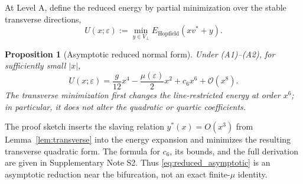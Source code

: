 \documentclass[a4paper,twocolumn,10pt]{article}
\newtheorem{proposition}{Proposition}
\newcommand{\eps}{\varepsilon}
\begin{document}
At Level A, define the reduced energy by partial minimization over the stable transverse directions,
\begin{equation}
U(x;\eps):=\min_{y\in V_\perp}E_{\mathrm{Hopfield}}(xv^*+y).
\label{eq:partial_minimization}
\end{equation}

\begin{proposition}[Asymptotic reduced normal form]
\label{prop:normal_form}
Under (A1)--(A2), for sufficiently small $|x|$,
\begin{equation}
U(x;\eps)=\frac{g}{12}x^4-\frac{\mu(\eps)}{2}x^2+c_6x^6+\mathcal{O}(x^8).
\label{eq:reduced_asymptotic}
\end{equation}
The transverse minimization first changes the line-restricted energy at order $x^6$; in particular,
it does not alter the quadratic or quartic coefficients.
\end{proposition}
The proof sketch inserts the slaving relation $y^*(x)=O(x^3)$ from
Lemma~\ref{lem:transverse} into the energy expansion and minimizes the resulting transverse
quadratic form. The formula for $c_6$, its bounds, and the full derivation are given in Supplementary
Note S2. Thus \eqref{eq:reduced_asymptotic} is an asymptotic reduction near the bifurcation, not an
exact finite-$\mu$ identity.
\end{document}
